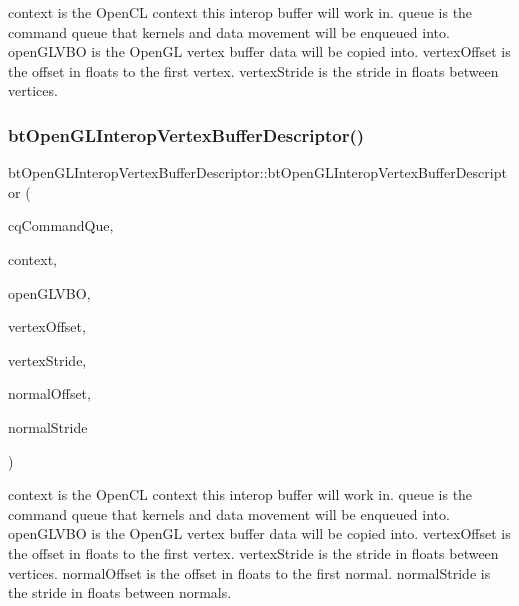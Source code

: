 context is the Open\+CL context this interop buffer will work in. queue is the command queue that kernels and data movement will be enqueued into. open\+G\+L\+V\+BO is the Open\+GL vertex buffer data will be copied into. vertex\+Offset is the offset in floats to the first vertex. vertex\+Stride is the stride in floats between vertices. \mbox{\label{classbtOpenGLInteropVertexBufferDescriptor_a427f8c5e77e3a8a4334c3a63d97c17ba}} 
\subsubsection{\texorpdfstring{bt\+Open\+G\+L\+Interop\+Vertex\+Buffer\+Descriptor()}{btOpenGLInteropVertexBufferDescriptor()}\hspace{0.1cm}{\footnotesize\ttfamily [2/4]}}
{\footnotesize\ttfamily bt\+Open\+G\+L\+Interop\+Vertex\+Buffer\+Descriptor\+::bt\+Open\+G\+L\+Interop\+Vertex\+Buffer\+Descriptor (\begin{DoxyParamCaption}\item[{cl\+\_\+command\+\_\+queue}]{cq\+Command\+Que,  }\item[{cl\+\_\+context}]{context,  }\item[{G\+Luint}]{open\+G\+L\+V\+BO,  }\item[{int}]{vertex\+Offset,  }\item[{int}]{vertex\+Stride,  }\item[{int}]{normal\+Offset,  }\item[{int}]{normal\+Stride }\end{DoxyParamCaption})\hspace{0.3cm}{\ttfamily [inline]}}

context is the Open\+CL context this interop buffer will work in. queue is the command queue that kernels and data movement will be enqueued into. open\+G\+L\+V\+BO is the Open\+GL vertex buffer data will be copied into. vertex\+Offset is the offset in floats to the first vertex. vertex\+Stride is the stride in floats between vertices. normal\+Offset is the offset in floats to the first normal. normal\+Stride is the stride in floats between normals. \mbox{\label{classbtOpenGLInteropVertexBufferDescriptor_aaa1a32a4c4589836a19b8965f8c8a828}} 

